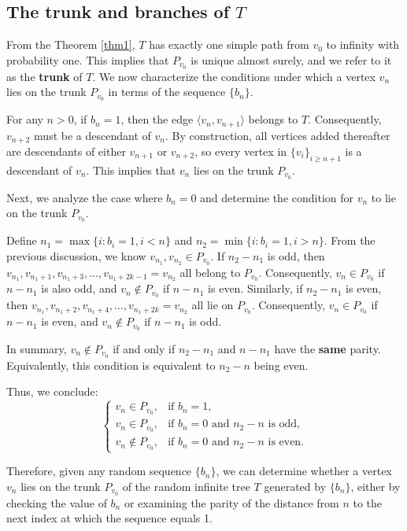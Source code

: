 \documentclass[10pt,twoside]{article}
\begin{document}
\subsection{The trunk and branches of $T$}

From the Theorem \ref{thm1}, $T$ has exactly one simple path from $ v_0 $ to infinity with probability one. This implies that $ P_{v_0} $ is unique almost surely, and we refer to it as the \textbf{trunk} of $T$. We now characterize the conditions under which a vertex $ v_n$ lies on the trunk $P_{v_0} $ in terms of the sequence $ \{b_n\} $.

For any $ n > 0 $, if $ b_n = 1 $, then the edge $ \langle v_n, v_{n+1} \rangle $ belongs to $T$. Consequently, $ v_{n+2} $ must be a descendant of $ v_n $. By construction, all vertices added thereafter are descendants of either $ v_{n+1} $ or $ v_{n+2} $, so every vertex in $ \{v_i\}_{i \geq n+1} $ is a descendant of $ v_n $. This implies that $ v_n $ lies on the trunk $P_{v_0} $.

Next, we analyze the case where $ b_n = 0 $ and determine the condition for $ v_n$ to lie on the trunk $P_{v_0} $. 

Define $ n_1 = \max\{i : b_i = 1, i < n\} $ and $ n_2 = \min\{i : b_i = 1, i > n\} $. From the previous discussion, we know $ v_{n_1}, v_{n_2} \in P_{v_0} $. If $n_2 - n_1 $ is odd, then $ v_{n_1}, v_{n_1+1}, v_{n_1+3}, \ldots, v_{n_1+2k-1} = v_{n_2} $ all belong to $ P_{v_0} $. Consequently, $ v_n \in P_{v_0} $ if $ n - n_1 $ is also odd, and $ v_n \notin P_{v_0} $ if $ n - n_1 $ is even. Similarly, if $ n_2 - n_1 $ is even, then $ v_{n_1}, v_{n_1+2}, v_{n_1+4}, \ldots, v_{n_1+2k} = v_{n_2} $ all lie on $ P_{v_0} $. Consequently, $ v_n \in P_{v_0} $ if $ n - n_1 $ is even, and $ v_n \notin P_{v_0} $ if $ n - n_1 $ is odd.

In summary, $ v_n \notin P_{v_0} $ if and only if $ n_2-n_1 $ and $ n-n_1 $ have the \textbf{same} parity. Equivalently, this condition is equivalent to $n_2 - n $ being even.

Thus, we conclude:
$$
\begin{cases}
v_n \in P_{v_0}, & \text{if } b_n = 1, \\
v_n \in P_{v_0}, & \text{if } b_n = 0 \text{ and } n_2 - n \text{ is odd},\\
v_n \notin P_{v_0}, & \text{if } b_n = 0 \text{ and } n_2 - n \text{ is even}.
\end{cases}
$$


Therefore, given any random sequence $ \{b_n\}$, we can determine whether a vertex $ v_n $ lies on the trunk $ P_{v_0} $ of the random infinite tree $T$ generated by $ \{b_n\} $, either by checking the value of $ b_n $ or examining the parity of the distance from $ n $ to the next index at which the sequence equals 1.
\end{document}
